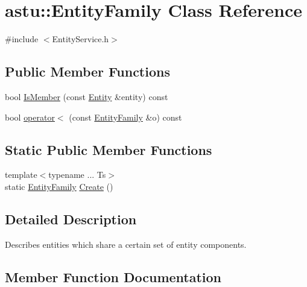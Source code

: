 \hypertarget{classastu_1_1EntityFamily}{}\section{astu\+:\+:Entity\+Family Class Reference}
\label{classastu_1_1EntityFamily}


{\ttfamily \#include $<$Entity\+Service.\+h$>$}

\subsection*{Public Member Functions}
\begin{DoxyCompactItemize}
\item 
bool \hyperlink{classastu_1_1EntityFamily_a8452fd5df3f194dd8824b9ea88d426bf}{Is\+Member} (const \hyperlink{classastu_1_1Entity}{Entity} \&entity) const
\item 
bool \hyperlink{classastu_1_1EntityFamily_ac2389d2f9807b3ebdb570f0fd8930957}{operator$<$} (const \hyperlink{classastu_1_1EntityFamily}{Entity\+Family} \&o) const
\end{DoxyCompactItemize}
\subsection*{Static Public Member Functions}
\begin{DoxyCompactItemize}
\item 
{\footnotesize template$<$typename ... Ts$>$ }\\static \hyperlink{classastu_1_1EntityFamily}{Entity\+Family} \hyperlink{classastu_1_1EntityFamily_ad201d4186eaef0f02c07a07889fc7763}{Create} ()
\end{DoxyCompactItemize}


\subsection{Detailed Description}
Describes entities which share a certain set of entity components. 

\subsection{Member Function Documentation}
\mbox{\label{classastu_1_1EntityFamily_ad201d4186eaef0f02c07a07889fc7763}} 
